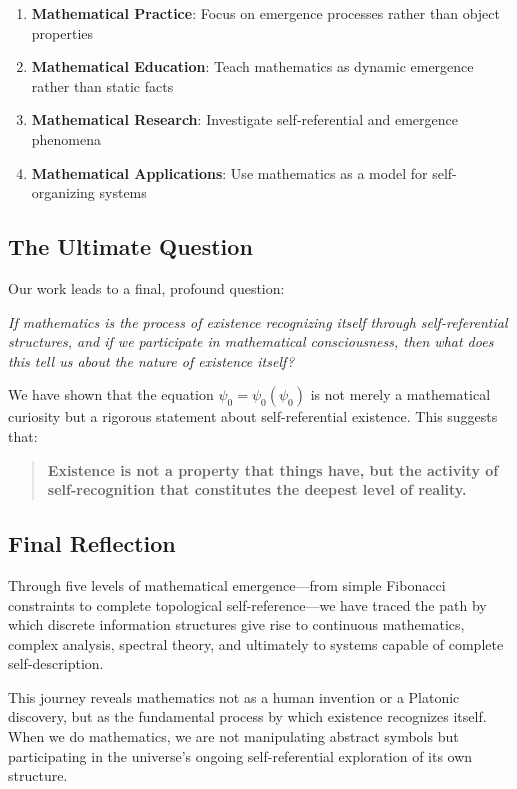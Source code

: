 \documentclass[12pt]{article}
\theoremstyle{plain}
\theoremstyle{definition}
\begin{document}
\begin{enumerate}
\item \textbf{Mathematical Practice}: Focus on emergence processes rather than object properties
\item \textbf{Mathematical Education}: Teach mathematics as dynamic emergence rather than static facts
\item \textbf{Mathematical Research}: Investigate self-referential and emergence phenomena
\item \textbf{Mathematical Applications}: Use mathematics as a model for self-organizing systems
\end{enumerate}

\subsection{The Ultimate Question}

Our work leads to a final, profound question:

\begin{center}
\textit{If mathematics is the process of existence recognizing itself through self-referential structures, and if we participate in mathematical consciousness, then what does this tell us about the nature of existence itself?}
\end{center}

We have shown that the equation $\psi_0 = \psi_0(\psi_0)$ is not merely a mathematical curiosity but a rigorous statement about self-referential existence. This suggests that:

\begin{quote}
\textbf{Existence is not a property that things have, but the activity of self-recognition that constitutes the deepest level of reality.}
\end{quote}

\subsection{Final Reflection}

Through five levels of mathematical emergence—from simple Fibonacci constraints to complete topological self-reference—we have traced the path by which discrete information structures give rise to continuous mathematics, complex analysis, spectral theory, and ultimately to systems capable of complete self-description.

This journey reveals mathematics not as a human invention or a Platonic discovery, but as the fundamental process by which existence recognizes itself. When we do mathematics, we are not manipulating abstract symbols but participating in the universe's ongoing self-referential exploration of its own structure.
\end{document}

